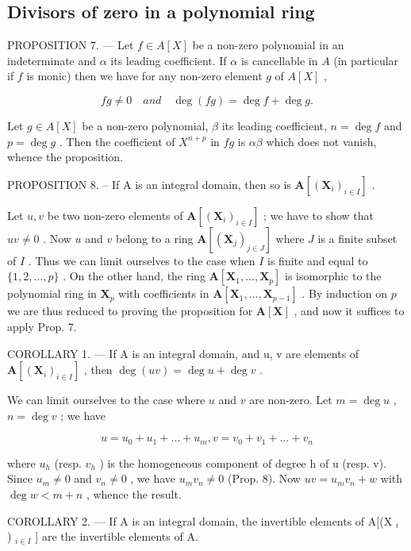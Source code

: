 \subsection{Divisors of zero in a polynomial ring}

PROPOSITION 7. --- Let \(f \in A[X]\) be a non-zero polynomial in an indeterminate and \(\alpha\) its leading coefficient. If \(\alpha\) is cancellable in \(A\) (in particular if \(f\) is monic) then we have for any non-zero element \(g\) of \(A[X]\) ,

\[
f g \neq 0 \quad a n d \quad \deg (f g) = \deg f + \deg g.
\]

Let \(g \in A[X]\) be a non-zero polynomial, \(\beta\) its leading coefficient, \(n = \deg f\) and \(p = \deg g\) . Then the coefficient of \(X^{n+p}\) in \(fg\) is \(\alpha\beta\) which does not vanish, whence the proposition.

PROPOSITION 8. -- If A is an integral domain, then so is \(\mathbf{A}[(\mathbf{X}_i)_{i\in I}]\) .

Let \(u, v\) be two non-zero elements of \(\mathbf{A}[(\mathbf{X}_i)_{i \in I}]\) ; we have to show that \(uv \neq 0\) . Now \(u\) and \(v\) belong to a ring \(\mathbf{A}[(\mathbf{X}_j)_{j \in J}]\) where \(J\) is a finite subset of \(I\) . Thus we can limit ourselves to the case when \(I\) is finite and equal to \(\{1, 2, \ldots, p\}\) . On the other hand, the ring \(\mathbf{A}[\mathbf{X}_1, \ldots, \mathbf{X}_p]\) is isomorphic to the polynomial ring in \(\mathbf{X}_p\) with coefficients in \(\mathbf{A}[\mathbf{X}_1, \ldots, \mathbf{X}_{p-1}]\) . By induction on \(p\) we are thus reduced to proving the proposition for \(\mathbf{A}[\mathbf{X}]\) , and now it suffices to apply Prop. 7.

COROLLARY 1. --- If A is an integral domain, and u, v are elements of \(\mathbf{A}[(\mathbf{X}_{i})_{i\in I}]\) , then \(\deg(uv)=\deg u+\deg v\) .

We can limit ourselves to the case where \(u\) and \(v\) are non-zero. Let \(m = \deg u\) , \(n = \deg v\) ; we have

\[
u = u _ {0} + u _ {1} + \dots + u _ {m}, v = v _ {0} + v _ {1} + \dots + v _ {n}
\]

where \(u_{h}\) (resp. \(v_{h}\) ) is the homogeneous component of degree h of u (resp. v). Since \(u_{m} \neq 0\) and \(v_{n} \neq 0\) , we have \(u_{m}v_{n} \neq 0\) (Prop. 8). Now \(uv = u_{m}v_{n} + w\) with \(\deg w < m + n\) , whence the result.

COROLLARY 2. --- If A is an integral domain, the invertible elements of A{[}(X \(_{i}\) ) \(_{i \in I}\) {]} are the invertible elements of A.


